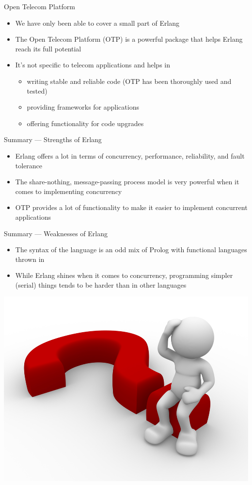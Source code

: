 \documentclass[12pt,xcolor=svgnames]{beamer}
\begin{document}
\begin{frame}{Open Telecom Platform}
\begin{itemize}
\item We have only been able to cover a small part of Erlang
\item The Open Telecom Platform (OTP) is a powerful package that helps Erlang reach its full potential
\item It's not specific to telecom applications and helps in
\begin{itemize}
\item writing stable and reliable code (OTP has been thoroughly used and tested)
\item providing frameworks for applications
\item offering functionality for code upgrades
\end{itemize}
\end{itemize}
\end{frame}

\begin{frame}{Summary --- Strengths of Erlang}
\begin{itemize}
\item Erlang offers a lot in terms of concurrency, performance, reliability, and fault tolerance
\item The share-nothing, message-passing process model is very powerful when it comes to implementing
concurrency
\item OTP provides a lot of functionality to make it easier to implement concurrent applications
\end{itemize}
\end{frame}

\begin{frame}{Summary --- Weaknesses of Erlang}
\begin{itemize}
\item The syntax of the language is an odd mix of Prolog with functional languages thrown in
\item While Erlang shines when it comes to concurrency, programming simpler (serial) things tends to be harder
than in other languages
\end{itemize}
\end{frame}

\begin{frame}{}
\centerline{\includegraphics{images/ask-question-1.png}}
\end{frame}
\end{document}
